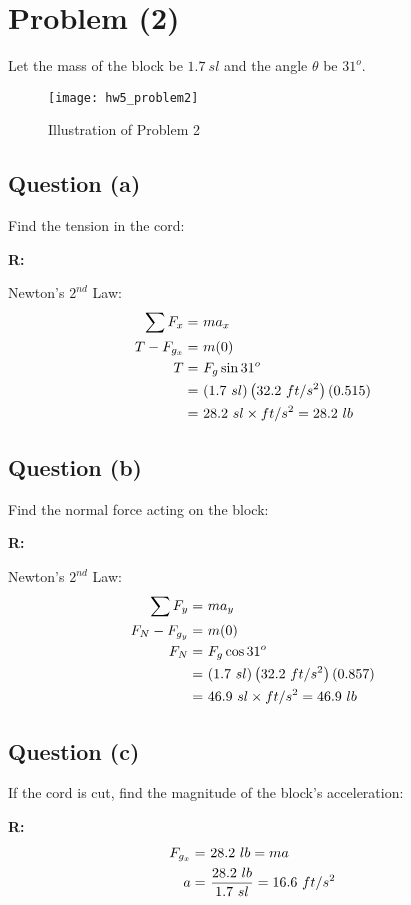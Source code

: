 \section{Problem (2)}

	Let the mass of the block be $1.7 \ sl$ and the angle $\theta$ be $31^{o}$.

	\begin{figure}[H]
		\begin{center}
			\texttt{[image: hw5\_problem2]}
			\caption{Illustration of Problem 2}
			\label{fig:hw5_problem2}
		\end{center}
	\end{figure}

	\subsection{Question (a)}

		Find the tension in the cord:

		\textbf{R:} \newline

		Newton's $2^{nd}$ Law:
		\begin{align}
			\sum F_{x} = \ &ma_{x}& \notag \\
			T - F_{g_{x}} = \ &m(0)& \notag \\
			T = \ &F_{g} \sin 31^{o}& \notag \\
			= \ &(1.7 \ sl)\left( 32.2 \ ft/s^{2} \right)(0.515)& \notag \\
			= \ &28.2 \ sl \times ft/s^{2} = 28.2 \ lb&
		\end{align}

	\subsection{Question (b)}

		Find the normal force acting on the block:

		\textbf{R:} \newline

		Newton's $2^{nd}$ Law:
		\begin{align}
			\sum F_{y} = \ &ma_{y}& \notag \\
			F_{N} - F_{g_{y}} = \ &m(0)& \notag \\
			F_{N} = \ &F_{g} \cos 31^{o}& \notag \\
			= \ &(1.7 \ sl)\left( 32.2 \ ft/s^{2} \right)(0.857)& \notag \\
			= \ &46.9 \ sl \times ft/s^{2} = 46.9 \ lb&
		\end{align}

	\subsection{Question (c)}

		If the cord is cut, find the magnitude of the block's acceleration:

		\textbf{R:} \newline
		\begin{align}
			F_{g_{x}} = \ &28.2 \ lb = ma& \notag \\
			a = \ &\frac{28.2 \ lb}{1.7 \ sl} = 16.6 \ ft/s^{2}&
		\end{align}

